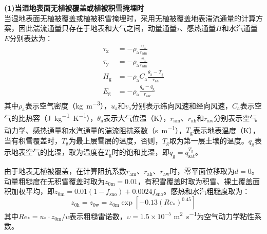 \textbf {(1)当湿地表面无植被覆盖或植被积雪掩埋时}\\

当湿地表面无植被覆盖或植被积雪掩埋时，采用无植被覆盖地表湍流通量的计算方案，因此湍流通量只存在于地表和大气之间，动量通量$\tau$、感热通量$H$和水汽通量$E$分别表达为：
\begin{align}
  \tau_{\mathrm {x}}  &= -\rho_{\mathrm{a}} \frac{u_{\mathrm{a}}}{r_{\mathrm{am}}} \\
  \tau_{\mathrm {y}}  &= -\rho_{\mathrm{a}} \frac{v_{\mathrm{a}}}{r_{\mathrm{am}}} \\
  H_{\mathrm {g}}  &= -\rho_{\mathrm{a}} C_{\mathrm{a}} \frac{\theta_{\mathrm{a}}-T_{\mathrm {g}} }{r_{\mathrm{ah}}} \\
  E_{\mathrm {g}}  &= -\rho_{\mathrm{a}} \frac{q_{\mathrm{a}}-q_{\mathrm {g}} }{r_{\mathrm{aw}}}
\end{align}
其中$\rho_{\mathrm{a}}$表示空气密度（\unit{kg.m^{-3}}），$u_{\mathrm{a}}$和$v_{\mathrm{a}}$分别表示纬向风速和经向风速，$C_{\mathrm{a}}$表示空气的比热容（\unit{J.kg^{-1}.K^{-1}}），$\theta_{\mathrm{a}}$表示大气位温（K），$r_{\mathrm{am}}$、$r_{\mathrm{ah}}$和$r_{\mathrm{aw}}$分别表示空气动力学、感热通量和水汽通量的湍流阻抗系数（\unit{s.m^{-1}}），$T_{\mathrm {g}} $表示地表温度（K），当有积雪覆盖时，$T_{\mathrm {g}} $为最上层雪层的温度，否则，$T_{\mathrm {g}} $取为第一层土壤的温度。$q_{\mathrm {g}} $表示地表空气的比湿，取为温度在$T_{\mathrm {g}} $时的饱和比湿，即$q_{\mathrm {g}} =q^{T_{\mathrm {g}} }_{\mathrm{sat}}$。

由于地表无植被覆盖，在计算阻抗系数$r_{\mathrm{am}}$、$r_{\mathrm{ah}}$、$r_{\mathrm{aw}}$时，零平面位移取为$d=0$。动量粗糙度在无积雪覆盖时取为$z_{\mathrm{0m}}=0.01$，有积雪覆盖时取为积雪、裸土覆盖面积加权平均，即$z_{\mathrm{0m}}=0.01 \left(1-f_{\mathrm{sno}}\right)+0.0024 f_{\mathrm{sno}}$。感热和水汽粗糙度取为：
\begin{equation}
  z_{\mathrm{0h}}=z_{\mathrm{0w}}=z_{\mathrm{0m}}\exp{\left[-0.13\left(Re_*\right)^{0.45}\right]}
\end{equation}
其中$Re_*=u_*\cdot z_{\mathrm{0m}}/\upsilon$表示粗糙雷诺数，$\upsilon= 1.5 \times 10^{-5}$ \unit{m^2.s^{-1}}为空气动力学粘性系数。

